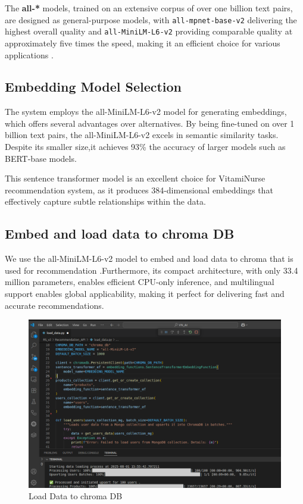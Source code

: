  The \textbf{all-*} models, trained on an extensive corpus of over one billion text pairs, are designed as general-purpose models, with \texttt{all-mpnet-base-v2} delivering the highest overall quality and \texttt{all-MiniLM-L6-v2} providing comparable quality at approximately five times the speed, making it an efficient choice for various applications \cite{sbert2025models}.

 
\subsection{Embedding Model Selection}
The system employs the all-MiniLM-L6-v2 model for generating embeddings, which offers several advantages over alternatives. By being fine-tuned on over 1 billion text pairs, the all-MiniLM-L6-v2 excels in semantic similarity tasks. Despite its smaller size,it achieves 93\% the accuracy of larger models such as BERT-base models.
\par This sentence transformer model is an excellent choice for VitamiNurse recommendation system, as it produces 384-dimensional embeddings that effectively capture subtle relationships within the data. \cite{sentence-transformers-all-MiniLM-L12-v2}


\subsection{Embed and load data to chroma DB}
We use the all-MiniLM-L6-v2 model to embed and load data to chroma that is used for recommendation .Furthermore, its compact architecture, with only 33.4 million parameters, enables efficient CPU-only inference, and multilingual support enables global applicability, making it perfect for delivering fast and accurate recommendations.
\begin{figure}[H]
    \centering
    \includegraphics[scale=0.39]{images/load_data__0.png}
    \caption{Load Data to chroma DB} 
    \label{fig:load_data_chroma}
\end{figure}

